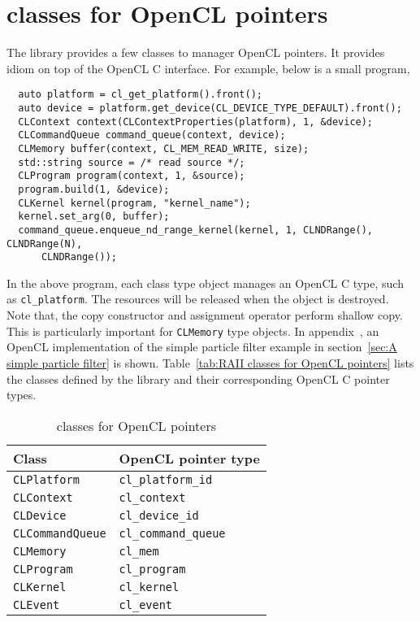 \section{\protect\raii classes for OpenCL pointers}
\label{sec:RAII classes for OpenCL pointers}

The library provides a few classes to manager OpenCL pointers. It provides
\raii idiom on top of the OpenCL C interface. For example, below is a small
program,
\begin{Verbatim}
  auto platform = cl_get_platform().front();
  auto device = platform.get_device(CL_DEVICE_TYPE_DEFAULT).front();
  CLContext context(CLContextProperties(platform), 1, &device);
  CLCommandQueue command_queue(context, device);
  CLMemory buffer(context, CL_MEM_READ_WRITE, size);
  std::string source = /* read source */;
  CLProgram program(context, 1, &source);
  program.build(1, &device);
  CLKernel kernel(program, "kernel_name");
  kernel.set_arg(0, buffer);
  command_queue.enqueue_nd_range_kernel(kernel, 1, CLNDRange(), CLNDRange(N),
      CLNDRange());
\end{Verbatim}
In the above program, each class type object manages an OpenCL C type, such as
\verb|cl_platform|. The resources will be released when the object is
destroyed. Note that, the copy constructor and assignment operator perform
shallow copy. This is particularly important for \verb|CLMemory| type objects.
In appendix~, an
OpenCL implementation of the simple particle filter example in
section~\ref{sec:A simple particle filter} is shown. Table~\ref{tab:RAII
  classes for OpenCL pointers} lists the classes defined by the library and
their corresponding OpenCL C pointer types.

\begin{table}
  \begin{tabularx}{\textwidth}{LL}
    \toprule
    Class & OpenCL pointer type \\
    \midrule
    \verb|CLPlatform|     & \verb|cl_platform_id|   \\
    \verb|CLContext|      & \verb|cl_context|       \\
    \verb|CLDevice|       & \verb|cl_device_id|     \\
    \verb|CLCommandQueue| & \verb|cl_command_queue| \\
    \verb|CLMemory|       & \verb|cl_mem|           \\
    \verb|CLProgram|      & \verb|cl_program|       \\
    \verb|CLKernel|       & \verb|cl_kernel|        \\
    \verb|CLEvent|        & \verb|cl_event|         \\
    \bottomrule
  \end{tabularx}
  \caption{\protect\raii classes for OpenCL pointers}
  \label{tab:RAII classes for OpenCL pointers}
\end{table}

